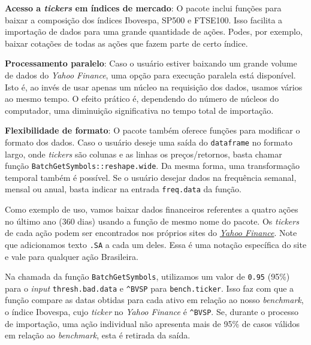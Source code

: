 \documentclass[
  11pt,
]{book}
\begin{document}
\textbf{Acesso a \emph{tickers} em índices de mercado}: O pacote inclui funções para baixar a composição dos índices Ibovespa, SP500 e FTSE100. Isso facilita a importação de dados para uma grande quantidade de ações. Podes, por exemplo, baixar cotações de todas as ações que fazem parte de certo índice.

\textbf{Processamento paralelo}: Caso o usuário estiver baixando um grande volume de dados do \emph{Yahoo Finance}, uma opção para execução paralela está disponível. Isto é, ao invés de usar apenas um núcleo na requisição dos dados, usamos vários ao mesmo tempo. O efeito prático é, dependendo do número de núcleos do computador, uma diminuição significativa no tempo total de importação.

\textbf{Flexibilidade de formato}: O pacote também oferece funções para modificar o formato dos dados. Caso o usuário deseje uma saída do \texttt{dataframe} no formato largo, onde \emph{tickers} são colunas e as linhas os preços/retornos, basta chamar função \texttt{BatchGetSymbols::reshape.wide}. Da mesma forma, uma transformação temporal também é possível. Se o usuário desejar dados na frequência semanal, mensal ou anual, basta indicar na entrada \texttt{freq.data} da função.

Como exemplo de uso, vamos baixar dados financeiros referentes a quatro ações no último ano (360 dias) usando a função de mesmo nome do pacote. Os \emph{tickers} de cada ação podem ser encontrados nos próprios sites do \href{https://br.financas.yahoo.com/}{\emph{Yahoo Finance}}. Note que adicionamos texto \texttt{.SA} a cada um deles. Essa é uma notação específica do site e vale para qualquer ação Brasileira.

Na chamada da função \texttt{BatchGetSymbols}, utilizamos um valor de \texttt{0.95} (95\%) para o \emph{input} \texttt{thresh.bad.data} e \texttt{\textquotesingle{}\^{}BVSP\textquotesingle{}} para \texttt{bench.ticker}. Isso faz com que a função compare as datas obtidas para cada ativo em relação ao nosso \emph{benchmark}, o índice Ibovespa, cujo \emph{ticker} no \emph{Yahoo Finance} é \texttt{\^{}BVSP}. Se, durante o processo de importação, uma ação individual não apresenta mais de 95\% de casos válidos em relação ao \emph{benchmark}, esta é retirada da saída.

\end{document}
